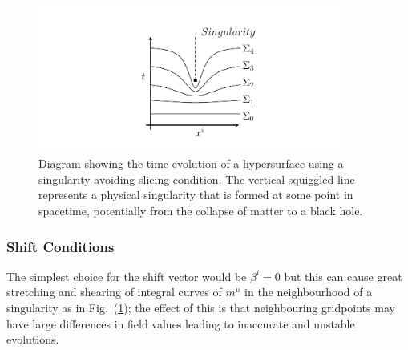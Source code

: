 \begin{figure}[h!]
    \includegraphics[width=0.9\textwidth]{svg/foliation.png} 
      \caption{Diagram showing the time evolution of a hypersurface using a singularity avoiding slicing condition. The vertical squiggled line represents a physical singularity that is formed at some point in spacetime, potentially from the collapse of matter to a black hole.} \label{nr:fig:singularity_avoiding}
\end{figure}


\subsubsection{Shift Conditions}

The simplest choice for the shift vector would be $\beta^i=0$ but this can cause great stretching and shearing of integral curves of $m^\mu$ in the neighbourhood of a singularity as in Fig.~(\ref{nr:fig:singularity_avoiding}); the effect of this is that neighbouring gridpoints may have large differences in field values leading to inaccurate and unstable evolutions.

